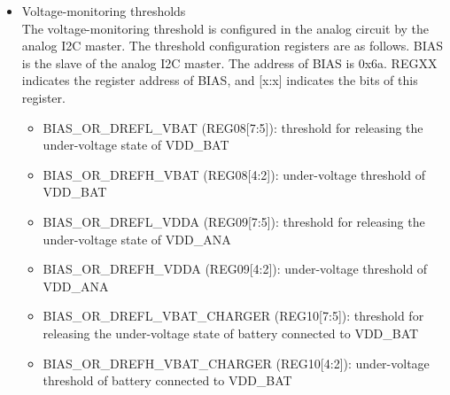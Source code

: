 \documentclass[main\_\_EN.tex]{subfiles}
\begin{document}
\begin{itemize}
    \item Voltage-monitoring thresholds\\
    The voltage-monitoring threshold is configured in the analog circuit by the analog I2C master. The threshold configuration registers are as follows. BIAS is the slave of the analog I2C master. The address of BIAS is 0x6a. REGXX indicates the register address of BIAS, and [x:x] indicates the bits of this register. \\
    \begin{itemize}
    \item BIAS\_OR\_DREFL\_VBAT (REG08[7:5]): threshold for releasing the under-voltage state of VDD\_BAT\\
    \item BIAS\_OR\_DREFH\_VBAT (REG08[4:2]): under-voltage threshold of VDD\_BAT\\
    \item BIAS\_OR\_DREFL\_VDDA (REG09[7:5]): threshold for releasing the under-voltage state of VDD\_ANA\\
    \item BIAS\_OR\_DREFH\_VDDA (REG09[4:2]): under-voltage threshold of VDD\_ANA\\
    \item BIAS\_OR\_DREFL\_VBAT\_CHARGER (REG10[7:5]): threshold for releasing the under-voltage state of battery connected to VDD\_BAT\\
    \item BIAS\_OR\_DREFH\_VBAT\_CHARGER (REG10[4:2]): under-voltage threshold of battery connected to VDD\_BAT\\
    \end{itemize}



\end{itemize}
\end{document}
